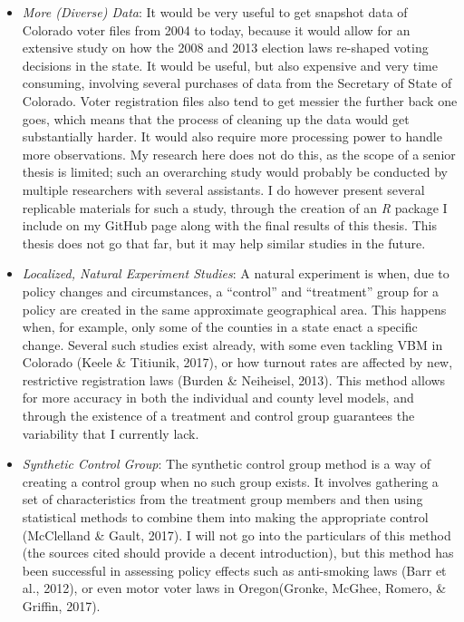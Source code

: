 \documentclass[12pt,twoside]{reedthesis}
\begin{document}
  \begin{itemize}
  \item
    \emph{More (Diverse) Data}: It would be very useful to get snapshot
    data of Colorado voter files from 2004 to today, because it would
    allow for an extensive study on how the 2008 and 2013 election laws
    re-shaped voting decisions in the state. It would be useful, but also
    expensive and very time consuming, involving several purchases of data
    from the Secretary of State of Colorado. Voter registration files also
    tend to get messier the further back one goes, which means that the
    process of cleaning up the data would get substantially harder. It
    would also require more processing power to handle more observations.
    My research here does not do this, as the scope of a senior thesis is
    limited; such an overarching study would probably be conducted by
    multiple researchers with several assistants. I do however present
    several replicable materials for such a study, through the creation of
    an \textit{R} package I include on my GitHub page along with the final
    results of this thesis. This thesis does not go that far, but it may
    help similar studies in the future.
  \item
    \emph{Localized, Natural Experiment Studies}: A natural experiment is
    when, due to policy changes and circumstances, a ``control'' and
    ``treatment'' group for a policy are created in the same approximate
    geographical area. This happens when, for example, only some of the
    counties in a state enact a specific change. Several such studies
    exist already, with some even tackling VBM in Colorado (Keele \&
    Titiunik, 2017), or how turnout rates are affected by new, restrictive
    registration laws (Burden \& Neiheisel, 2013). This method allows for
    more accuracy in both the individual and county level models, and
    through the existence of a treatment and control group guarantees the
    variability that I currently lack.
  \item
    \emph{Synthetic Control Group}: The synthetic control group method is
    a way of creating a control group when no such group exists. It
    involves gathering a set of characteristics from the treatment group
    members and then using statistical methods to combine them into making
    the appropriate control (McClelland \& Gault, 2017). I will not go
    into the particulars of this method (the sources cited should provide
    a decent introduction), but this method has been successful in
    assessing policy effects such as anti-smoking laws (Barr et al.,
    2012), or even motor voter laws in Oregon(Gronke, McGhee, Romero, \&
    Griffin, 2017).
  \end{itemize}
  
\end{document}
